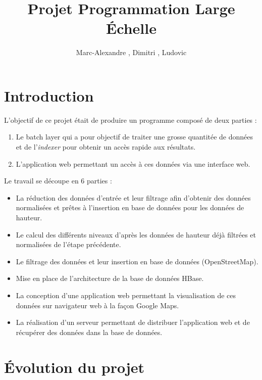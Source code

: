 \documentclass[a4paper]{article}
\title{Projet Programmation Large Échelle}
\author{Marc-Alexandre \sc{Espiaut}, Dimitri \sc{Prestat}, Ludovic \sc{San Nicolas}}
\begin{document}
\maketitle

\section{Introduction}

L'objectif de ce projet était de produire un programme composé de deux parties :
\begin{enumerate}
\item Le \textsf{batch layer} qui a pour objectif de traiter une grosse quantitée de données et de l'\emph{indexer} pour obtenir un accès rapide aux résultats.
\item L'\textsf{application web} permettant un accès à ces données via une interface web.
\end{enumerate}

	Le travail se découpe en 6 parties :
\begin{itemize}
\item La réduction des données d'entrée et leur filtrage afin d'obtenir des données normalisées et prêtes à l'insertion en base de données pour les données de hauteur.
\item Le calcul des différents niveaux d'après les données de hauteur déjà filtrées et normalisées de l'étape précédente.
\item Le filtrage des données et leur insertion en base de données (OpenStreetMap). %
\item Mise en place de l'architecture de la base de données HBase.
\item La conception d'une application web permettant la visualisation de ces données sur navigateur web à la façon Google Maps.
\item La réalisation d'un serveur permettant de distribuer l'application web et de récupérer des données dans la base de données.
\end{itemize}

\section{Évolution du projet}
\end{document}
